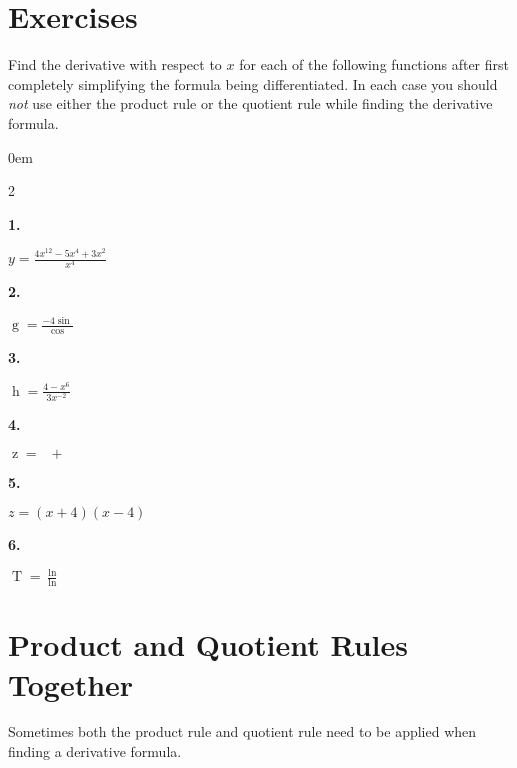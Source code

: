 \documentclass[12pt,]{book}
\theoremstyle{plain}
\theoremstyle{definition}
\numberwithin{equation}{section}
\newenvironment{exercisegroup}%
{\medskip\noindent}%
{\par\bigskip}%
\newlength{\exercisegroupindent}%
\newlength{\exercisegroupitemwidth}%
\newenvironment{exercisegrouplist}%
{\vspace{-\partopsep}%
\begin{adjustwidth}{\exercisegroupindent}{0em}}%
{\end{adjustwidth}%
\vspace{-\partopsep}%
\vspace{\baselineskip}}%
\newenvironment{exercisegroupbycol}[1]%
{\begin{exercisegrouplist}%
\vspace{-\multicolsep}%
\begin{multicols}{#1}%
\setlength{\parindent}{0em}%
\setlength{\exercisegroupitemwidth}{\linewidth}}%
{\end{multicols}%
\vspace{-\multicolsep}%
\end{exercisegrouplist}}%
\newenvironment{exercisegroupitem}[1]%
{\begin{minipage}[t]{\exercisegroupitemwidth}
\vspace{0pt}%
{\bfseries#1}%
\rule{0pt}{\baselineskip}}{\strut%
\end{minipage}%
\hspace{\columnsep}}%
\providecommand\phantomsection{}
\newcommand{\fe}[2]{\mathop{{#1}{\left(#2\right)}}}
\begin{document}
\section*{Exercises}\label{exercises-35}

\begin{exercisegroup}%
Find the derivative with respect to \(x\) for each of the following functions after first completely simplifying the formula being differentiated.  In each case you should \emph{not} use either the product rule or the quotient rule while finding the derivative formula.%
\begin{exercisegroupbycol}{2}%
\begin{exercisegroupitem}{1. }\phantomsection\hypertarget{exercise-262}{\null}
\(y=\frac{4x^{12}-5x^4+3x^2}{x^4}\)%
\end{exercisegroupitem}%
\par%
\begin{exercisegroupitem}{2. }\phantomsection\hypertarget{exercise-263}{\null}
\(\fe{g}{x}=\frac{-4\fe{\sin}{x}}{\fe{\cos}{x}}\)%
\end{exercisegroupitem}%
\par%
\begin{exercisegroupitem}{3. }\phantomsection\hypertarget{exercise-264}{\null}
\(\fe{h}{x}=\frac{4-x^6}{3x^{-2}}\)%
\end{exercisegroupitem}%
\par%
\begin{exercisegroupitem}{4. }\phantomsection\hypertarget{exercise-265}{\null}
\(\fe{z}{x}=\fe{\sin^2}{x}+\fe{\cos^2}{x}\)%
\end{exercisegroupitem}%
\par%
\begin{exercisegroupitem}{5. }\phantomsection\hypertarget{exercise-266}{\null}
\(z=(x+4)(x-4)\)%
\end{exercisegroupitem}%
\par%
\begin{exercisegroupitem}{6. }\phantomsection\hypertarget{exercise-267}{\null}
\(\fe{T}{x}=\frac{\fe{\ln}{x}}{\fe{\ln}{x^2}}\)%
\end{exercisegroupitem}%
\par%
\end{exercisegroupbycol}%
\end{exercisegroup}%
\typeout{************************************************}
\typeout{************************************************}
\section[Product and Quotient Rules Together]{Product and Quotient Rules Together}\label{section-product-and-quotient-together}
Sometimes both the product rule and quotient rule need to be applied when finding a derivative formula.%
\typeout{************************************************}
\typeout{************************************************}
\end{document}

